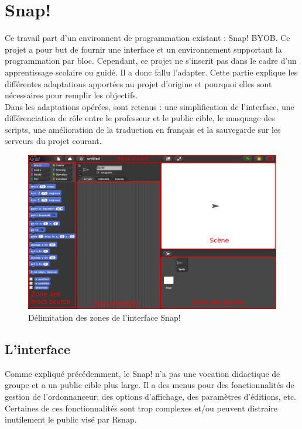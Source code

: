 \section{Snap!}
\label{solution SNAP}
Ce travail part d'un environnent de programmation existant : Snap! BYOB. Ce projet a pour but de fournir une interface et un environnement supportant la programmation par bloc. Cependant, ce projet ne s'inscrit pas dans le cadre d'un apprentissage scolaire ou guidé. Il a donc fallu l'adapter. Cette partie explique les différentes adaptations apportées au projet d'origine et pourquoi elles sont nécessaires pour remplir les objectifs.\\

Dans les adaptations opérées, sont retenus : une simplification de l'interface, une différenciation de rôle entre le professeur et le public cible, le masquage des scripts, une amélioration de la traduction en français et la sauvegarde sur les serveurs du projet courant.

\begin{figure}
  \begin{center}
  \includegraphics[width=\textwidth]{content/7-solution/2-snap/images/interface}
        \caption{Délimitation des zones de l'interface Snap!}
    \label{fig:snap interface}
  \end{center}
\end{figure}

\subsection{L'interface}
\label{interface}
Comme expliqué précédemment, le Snap! n'a pas une vocation didactique de groupe et a un public cible plus large. Il a des menus pour des fonctionnalités de gestion de l'ordonnanceur, des options d'affichage, des paramètres d'éditions, etc. Certaines de ces fonctionnalités sont trop complexes et/ou peuvent distraire inutilement le public visé par Rsnap.


